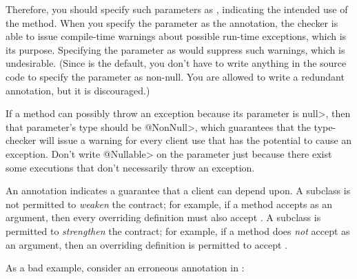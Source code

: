 Therefore, you should specify such parameters as
, indicating
the intended use of the method.  When you specify the parameter as the 
annotation, the checker is able to issue compile-time warnings about
possible run-time exceptions, which is its purpose.  Specifying the parameter
as  would suppress such warnings, which is undesirable.
(Since  is the default, you don't have to write anything in
the source code to specify the parameter as non-null.  You are allowed to
write a redundant  annotation, but it is discouraged.)

If a method can possibly throw an exception because its parameter
is \<null>, then that parameter's type should be \<@NonNull>, which
guarantees that the type-checker will issue a warning for every client
use that has the potential to cause an exception.  Don't write
\<@Nullable> on the parameter just because there exist some executions that
don't necessarily throw an exception.




An annotation indicates a guarantee that a client can depend upon.  A subclass
is not permitted to \emph{weaken} the contract; for example,
if a method accepts  as an argument, then every overriding
definition must also accept .
A subclass is permitted to \emph{strengthen} the contract; for example,
if a method does \emph{not} accept  as an argument, then an
overriding definition is permitted to accept .

\begin{sloppypar}
As a bad example, consider an erroneous  annotation in
\href{https://github.com/google/guava/blob/master/guava/src/com/google/common/collect/Multiset.java\#L129}{}:
\end{sloppypar}

